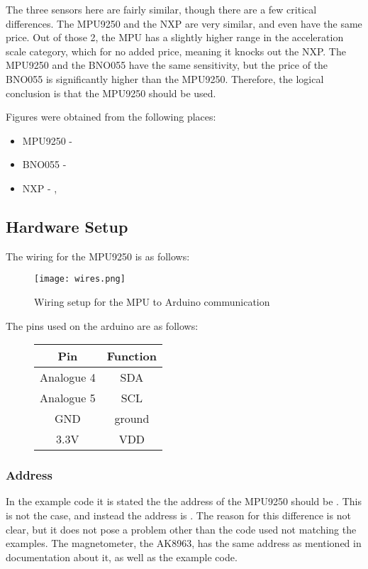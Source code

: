 The three sensors here are fairly similar, though there are a few critical differences.
The MPU9250 and the NXP are very similar, and even have the same price.
Out of those 2, the MPU has a slightly higher range in the acceleration scale category, which for no added price, meaning it knocks out the NXP.
The MPU9250 and the BNO055 have the same sensitivity, but the price of the BNO055 is significantly higher than the MPU9250.
Therefore, the logical conclusion is that the MPU9250 should be used.

Figures were obtained from the following places:
\begin{itemize}
\item MPU9250 - \cite{mpu}
\item BNO055  - \cite{bno}
\item NXP - \cite{nxp1} , \cite{nxp2}
\end{itemize}


\subsection{Hardware Setup}
The wiring for the MPU9250 is as follows:

\begin{figure}[H]
\centering
\texttt{[image: wires.png]}
\caption{Wiring setup for the MPU to Arduino communication}
\label{fig::wiring}
\end{figure}

The pins used on the arduino are as follows: 
\begin{figure}[H]
\centering
\begin{tabular}{|c|c|}
\hline
\textbf{Pin} & \textbf{Function} \\ \hline
Analogue 4 & SDA     \\ \hline
Analogue 5 & SCL     \\ \hline
GND        & ground  \\ \hline
3.3V       & VDD     \\ \hline
\end{tabular}
\end{figure}

\subsubsection{Address}
In the example code it is stated the the address of the MPU9250 should be .
This is not the case, and instead the address is .
The reason for this difference is not clear, but it does not pose a problem other than the code used not matching the examples.
The magnetometer, the AK8963, has the same address as mentioned in documentation about it, as well as the example code.

